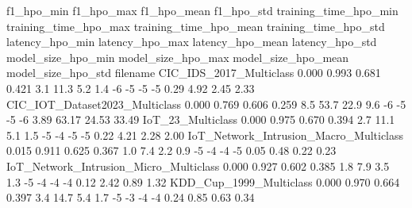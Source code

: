                                                                     f1_hpo_min f1_hpo_max f1_hpo_mean f1_hpo_std training_time_hpo_min training_time_hpo_max training_time_hpo_mean training_time_hpo_std latency_hpo_min latency_hpo_max latency_hpo_mean latency_hpo_std model_size_hpo_min model_size_hpo_max model_size_hpo_mean model_size_hpo_std
filename                                                                                                                                                                                                                                                                                                                                               
CIC_IDS_2017_Multiclass                                                  0.000      0.993       0.681      0.421                   3.1                  11.3                    5.2                   1.4              -6              -5               -5              -5               0.29               4.92                2.45               2.33
CIC_IOT_Dataset2023_Multiclass                                           0.000      0.769       0.606      0.259                   8.5                  53.7                   22.9                   9.6              -6              -5               -5              -6               3.89              63.17               24.53              33.49
IoT_23_Multiclass                                                        0.000      0.975       0.670      0.394                   2.7                  11.1                    5.1                   1.5              -5              -4               -5              -5               0.22               4.21                2.28               2.00
IoT_Network_Intrusion_Macro_Multiclass                                   0.015      0.911       0.625      0.367                   1.0                   7.4                    2.2                   0.9              -5              -4               -4              -5               0.05               0.48                0.22               0.23
IoT_Network_Intrusion_Micro_Multiclass                                   0.000      0.927       0.602      0.385                   1.8                   7.9                    3.5                   1.3              -5              -4               -4              -4               0.12               2.42                0.89               1.32
KDD_Cup_1999_Multiclass                                                  0.000      0.970       0.664      0.397                   3.4                  14.7                    5.4                   1.7              -5              -3               -4              -4               0.24               0.85                0.63               0.34
